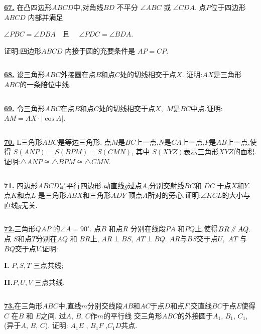 \documentclass{article}
\newcommand\pxx{%
\mathrel{\text{\tikz[baseline] \draw (0em,-0.3ex) -- (.4em,1.7ex) (.2em,-0.3ex) -- (.6em,1.7ex);}%
}}
\begin{document}
$$ $$

\href{http://www.artofproblemsolving.com/Forum/viewtopic.php?p=99759#p99759
 }{\bf 67.} 在凸四边形$ABCD$中,对角线$BD$ 不平分 $\angle ABC$ 或 $\angle CDA$. 点$P$位于四边形$ABCD$ 内部并满足

$\angle PBC=\angle DBA\quad $且 $ \quad \angle PDC=\angle BDA. $

证明:四边形$ABCD$ 内接于圆的充要条件是 $AP=CP$.


$$ $$

\href{ http://www.artofproblemsolving.com/Forum/viewtopic.php?p=564645#p564645
}{\bf 68.} 设三角形$ABC$外接圆在点$B$和点$C$处的切线相交于点$X.$ 证明:$AX$是三角形$ABC$的一条陪位中线.


$$ $$

\href{ http://www.artofproblemsolving.com/Forum/viewtopic.php?p=564645#p564645
}{\bf 69.} 令三角形$ABC$在点$B$和点$C$处的切线相交于点$X,$ $M$是$BC$中点.证明: $AM=AX\cdot\left|\cos A\right|$.


$$ $$

\href{http://www.artofproblemsolving.com/Forum/viewtopic.php?p=529958#p529958
 }{\bf 70.} L三角形$ABC$是等边三角形. 点$M$是$BC$上一点,$N$是$CA$上一点,$P$是$AB$上一点,使得 $S\left(ANP\right)=S\left(BPM\right)=S\left(CMN\right)$, 其中 $S\left(XYZ\right)$表示三角形$XYZ$的面积.
 证明:$\triangle ANP\cong\triangle BPM\cong\triangle CMN$.


$$ $$

\href{ http://www.artofproblemsolving.com/Forum/viewtopic.php?p=512720#p512720
}{\bf 71.}  四边形$ABCD$是平行四边形.动直线$g$过点$A$,分别交射线$BC$和 $DC$ 于点$X$和$Y$.点$K$和点$L$ 是三角形$ABX$和三角形$ADY$ 顶点$A$所对的旁心.证明:$\angle KCL$的大小与直线$g$无关.



$$ $$

\href{http://www.artofproblemsolving.com/Forum/viewtopic.php?p=477064#p477064
 }{\bf 72.}三角形$QAP$ 的$\angle A=90^{\circ}.$ 点$B$ 和点$R$ 分别在线段$PA$ 和$PQ$上,使得$BR\pxx AQ.$ 点 $S$和点$T$分别在$AQ$ 和 $BR$上, $AR\perp BS$,  $AT \perp BQ.$ $AR$与$BS$交于点$U,$ $AT$ 与 $BQ$交于点$V.$证明:

{\bf I.} $P,S,T$ 三点共线;

{\bf II.}$P,U,V$ 三点共线.


$$ $$

\href{http://www.artofproblemsolving.com/Forum/viewtopic.php?p=501529#p501529
 }{\bf 73.}在三角形$ABC$中,直线$m$分别交线段$AB$和$AC$于点$D$和点$F$,交直线$BC$于点$E$使得 $C$ 在$B$ 和 $E$之间. 过$A$, $B$, $C$作$m$的平行线 交三角形$ABC$的外接圆于$A_1$, $B_1$, $C_1$,(异于$A$, $B$, $C$). 证明: $A_1E$ , $B_1F$ ,$C_1D$共点.
\end{document}
